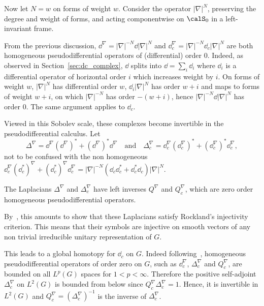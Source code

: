 
Now let $N=w$ on forms of weight $w$. Consider the operator $|\nabla|^N$, preserving the degree and weight of forms, and acting componentwise on $\calS_0$ in a left-invariant frame.

From the previous discussion, $\dd^{\nabla} = |\nabla|^{-N} \dd |\nabla|^N$ and $\dd_c^{\nabla} = |\nabla|^{-N} \dd_c |\nabla|^N$ are both homogeneous pseudodifferential operators of (differential) order $0$. Indeed, as observed in Section~\ref{sec:dc_complex}, $\dd$ splits into $\dd=\sum_i \dd_i$ where $\dd_i$ is a differential operator of horizontal order $i$ which increases weight by $i$. On forms of weight $w$, $|\nabla|^N$ has differential order $w$, $\dd_i |\nabla|^N$ has order $w+i$ and maps to forms of weight $w+i$, on which $ |\nabla|^{-N}$ has order $-(w+i)$, hence $|\nabla|^{-N} \dd |\nabla|^N$ has order $0$. The same argument applies to $\dd_c$.

Viewed in this Sobolev scale, these complexes become invertible in the pseudodifferential calculus. Let
\[
\Delta^{\nabla } = \dd^{\nabla} (\dd^{\nabla})^* + (\dd^{\nabla})^* \dd^\nabla
\quad \mathrm{and} \quad \Delta_c^{\nabla} = \dd_c^{\nabla} (\dd_c^{\nabla})^* + (\dd_c^{\nabla})^* \dd_c^\nabla,
\]
not to be confused with the non homogeneous $\dd_c^{\nabla} (\dd_c^*)^{\nabla} + (\dd_c^*)^{\nabla} \dd_c^{\nabla} = |\nabla|^{-N} (\dd_c \dd_c^* + \dd_c^* \dd_c) |\nabla|^N$.

\begin{theo}\label{thm:left_inverse}
The Laplacians $\Delta^{\nabla} $ and $\Delta_c^{\nabla } $ have left inverses $Q^{\nabla}$ and $Q_c^{\nabla}$, which are zero order homogeneous pseudodifferential operators.
\end{theo}

By~\cite[Theorem~6.2]{CGGP}, this amounts to show that these Laplacians satisfy Rockland's injectivity criterion. This means that their symbols are injective on smooth vectors of any non trivial irreducible unitary representation of $G$.

This leads to a global homotopy for $\dd_c$ on $G$. Indeed following~\cite[Proposition~1.9]{Folland_1975}, homogeneous pseudodifferential operators of order zero on $G$, such as $\dd_c^{\nabla}$, $\Delta_c^\nabla$ and $Q_c^{\nabla}$, are bounded on all $L^p(G)$ spaces for $1< p< \infty$. Therefore the positive self-adjoint $\Delta_c^{\nabla }$ on $L^2(G)$ is bounded from below since $Q_c^{\nabla} \Delta_c^{\nabla} = 1$. Hence, it is invertible in $L^2(G)$ and $Q_c^{\nabla} = (\Delta_c^{\nabla})^{-1}$ is the inverse of $\Delta_c^{\nabla}$.

